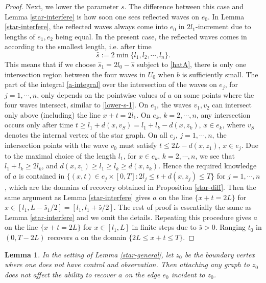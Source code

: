 \documentclass[11pt]{amsart}
\theoremstyle{definition}
\theoremstyle{plain}
\newtheorem{lemma}[definition]{Lemma}
\numberwithin{equation}{section}
\begin{document}
\begin{proof}
Next, we lower the parameter $s$.
The difference between this case and Lemma \ref{star-interfere} is how soon one sees reflected waves on $e_0$. In Lemma \ref{star-interfere}, the reflected waves always come into $e_0$ in $2l_1$-increment due to lengths of $e_1,e_2$ being equal.
In the present case, the reflected waves comes in according to the smallest length, i.e. after time 
$$\hat{s}:= 2\min\{l_1,l_2,\cdots,l_{n}\}.$$
This means that if we choose $\hat{s}_1=2l_0-\hat{s}$ subject to \eqref{hatA}, there is only one intersection region between the four waves in $U_0$ when $b$ is sufficiently small. 
The part of the integral \eqref{a-integral} over the intersection of the waves on $e_j$, for $j=1,\cdots,n$, only depends on the pointwise values of $a$ on some points where the four waves intersect, similar to \eqref{lower-s-1}. 
On $e_1$, the waves $v_1,v_2$ can intersect only above (including) the line $x+t=2l_1$.
On $e_k$, $k=2,\cdots,n$, any intersection occurs only after time $t\geq l_1+d(x,v_S)=l_1+l_k-d(x,z_k)$, $x\in e_k$, where $v_S$ denotes the internal vertex of the star graph.
On all $e_j$, $j=1,\cdots,n$, the intersection points with the wave $v_0$ must satisfy $t\leq 2L-d(x,z_1)$, $x\in e_j$.
Due to the maximal choice of the length $l_1$, for $x\in e_k$, $k=2,\cdots,n$, we see that $l_1+l_k\geq 2l_k$, and $d(x,z_1)\geq l_1\geq l_k\geq d(x,z_k)$.
Hence the required knowledge of $a$ is contained in $\{(x,t)\in e_j\times [0,T]: 2l_j \leq t+d(x,z_j) \leq T\}$ for $j=1,\cdots,n$, which are the domains of recovery obtained in Proposition \ref{star-diff}.
Then the same argument as Lemma \ref{star-interfere} gives $a$ on the line $\{x+t=2L\}$ for $x\in [l_1,L-\hat{s}_1/2]=[l_1,l_1+\hat{s}/2]$. 
The rest of proof is essentially the same as Lemma \ref{star-interfere} and we omit the details.
Repeating this procedure gives $a$ on the line $\{x+t=2L\}$ for $x\in [l_1,L]$ in finite steps due to $\hat{s}>0$.
Ranging $t_0$ in $(0,T-2L)$ recovers $a$ on the domain $\{2L\leq x+t \leq T\}$.
\end{proof}


\begin{lemma} \label{subtree}
In the setting of Lemma \ref{star-general},
let $z_0$ be the boundary vertex where one does not have control and observation.
Then attaching any graph to $z_0$ does not affect the ability to recover $a$ on the edge $e_0$ incident to $z_0$.
\end{lemma}
\end{document}

